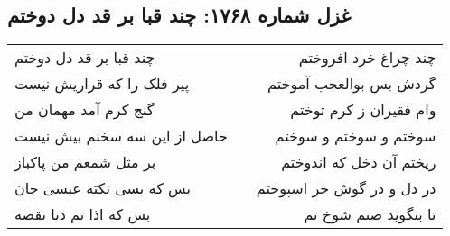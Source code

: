 \begin{center}
\section*{غزل شماره ۱۷۶۸: چند قبا بر قد دل دوختم}
\label{sec:1768}
\begin{longtable}{l p{0.5cm} r}
چند قبا بر قد دل دوختم
&&
چند چراغ خرد افروختم
\\
پیر فلک را که قراریش نیست
&&
گردش بس بوالعجب آموختم
\\
گنج کرم آمد مهمان من
&&
وام فقیران ز کرم توختم
\\
حاصل از این سه سخنم بیش نیست
&&
سوختم و سوختم و سوختم
\\
بر مثل شمعم من پاکباز
&&
ریختم آن دخل که اندوختم
\\
بس که بسی نکته عیسی جان
&&
در دل و در گوش خر اسپوختم
\\
بس که اذا تم دنا نقصه
&&
تا بنگوید صنم شوخ تم
\\
\end{longtable}
\end{center}
